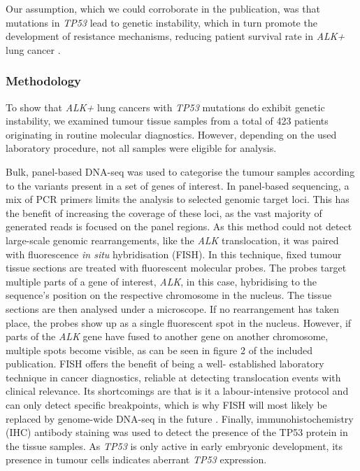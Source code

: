 Our assumption, which we could corroborate in the publication, was that
mutations in \textit{TP53} lead to genetic instability, which in turn promote
the development of resistance mechanisms, reducing patient survival rate in
\textit{ALK+} lung cancer \citep{Alidousty2018}.

\subsubsection{Methodology}\label{subsubsec:alkmethod}
To show that \textit{ALK+} lung cancers with \textit{TP53} mutations do
exhibit genetic instability, we examined tumour tissue samples from a total of
\num{423} patients originating in routine molecular diagnostics. However,
depending on the used laboratory procedure, not all samples were eligible for
analysis.

Bulk, panel-based DNA-seq was used to categorise the tumour samples according
to the variants present in a set of genes of interest. In panel-based
sequencing, a mix of PCR primers limits the analysis to selected genomic
target loci. This has the benefit of increasing the coverage of these loci, as
the vast majority of generated reads is focused on the panel regions. As this
method could not detect large-scale genomic rearrangements, like the \textit{%
ALK} translocation, it was paired with fluorescence \textit{in situ}
hybridisation (FISH). In this technique, fixed tumour tissue sections are
treated with fluorescent molecular probes. The probes target multiple parts of
a gene of interest, \textit{ALK}, in this case, hybridising to the sequence's
position on the respective chromosome in the nucleus. The tissue sections are
then analysed under a microscope. If no rearrangement has taken place, the
probes show up as a single fluorescent spot in the nucleus. However, if parts
of the \textit{ALK} gene have fused to another gene on another chromosome,
multiple spots become visible, as can be seen in figure 2 of the included
publication. FISH offers the benefit of being a well- established laboratory
technique in cancer diagnostics, reliable at detecting translocation events
with clinical relevance. Its shortcomings are that is it a labour-intensive
protocol and can only detect specific breakpoints, which is why FISH will most
likely be replaced by genome-wide DNA-seq in the future \citep{Skovgaard2011}.
Finally, immunohistochemistry (IHC) antibody staining was used to detect the
presence of the TP53 protein in the tissue samples. As \textit{TP53} is only
active in early embryonic development, its presence in tumour cells indicates
aberrant \textit{TP53} expression.

